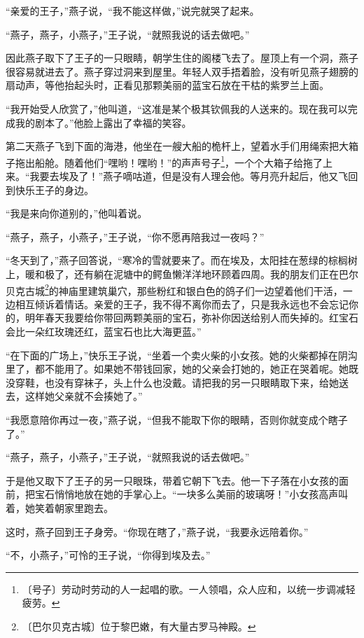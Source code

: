 \documentclass[12pt,UTF-8,openany]{ctexbook}
\begin{document}
\begin{normalsize}
    “亲爱的王子，”燕子说，“我不能这样做，”说完就哭了起来。
    
    “燕子，燕子，小燕子，”王子说，“就照我说的话去做吧。”
    
    因此燕子取下了王子的一只眼睛，朝学生住的阁楼飞去了。屋顶上有一个洞，燕子很容易就进去了。燕子穿过洞来到屋里。年轻人双手捂着脸，没有听见燕子翅膀的扇动声，等他抬起头时，正看见那颗美丽的蓝宝石放在干枯的紫罗兰上面。
    
    “我开始受人欣赏了，”他叫道，“这准是某个极其钦佩我的人送来的。现在我可以完成我的剧本了。”他脸上露出了幸福的笑容。
    
    第二天燕子飞到下面的海港，他坐在一艘大船的桅杆上，望着水手们用绳索把大箱子拖出船舱。随着他们“嘿哟！嘿哟！”的声声号子\footnote{〔号子〕劳动时劳动的人一起唱的歌。一人领唱，众人应和，以统一步调减轻疲劳。}，一个个大箱子给拖了上来。“我要去埃及了！”燕子嘀咕道，但是没有人理会他。等月亮升起后，他又飞回到快乐王子的身边。
    
    “我是来向你道别的，”他叫着说。
    
    “燕子，燕子，小燕子，”王子说，“你不愿再陪我过一夜吗？”
    
    “冬天到了，”燕子回答说，“寒冷的雪就要来了。而在埃及，太阳挂在葱绿的棕榈树上，暖和极了，还有躺在泥塘中的鳄鱼懒洋洋地环顾着四周。我的朋友们正在巴尔贝克古城\footnote{〔巴尔贝克古城〕位于黎巴嫩，有大量古罗马神殿。}的神庙里建筑巢穴，那些粉红和银白色的鸽子们一边望着他们干活，一边相互倾诉着情话。亲爱的王子，我不得不离你而去了，只是我永远也不会忘记你的，明年春天我要给你带回两颗美丽的宝石，弥补你因送给别人而失掉的。红宝石会比一朵红玫瑰还红，蓝宝石也比大海更蓝。”
    
    “在下面的广场上，”快乐王子说，“坐着一个卖火柴的小女孩。她的火柴都掉在阴沟里了，都不能用了。如果她不带钱回家，她的父亲会打她的，她正在哭着呢。她既没穿鞋，也没有穿袜子，头上什么也没戴。请把我的另一只眼睛取下来，给她送去，这样她父亲就不会揍她了。”
    
    “我愿意陪你再过一夜，”燕子说，“但我不能取下你的眼睛，否则你就变成个瞎子了。”
    
    “燕子，燕子，小燕子，”王子说，“就照我说的话去做吧。”
    
    于是他又取下了王子的另一只眼珠，带着它朝下飞去。他一下子落在小女孩的面前，把宝石悄悄地放在她的手掌心上。“一块多么美丽的玻璃呀！”小女孩高声叫着，她笑着朝家里跑去。
    
    这时，燕子回到王子身旁。“你现在瞎了，”燕子说，“我要永远陪着你。”
    
    “不，小燕子，”可怜的王子说，“你得到埃及去。”
    

\end{normalsize}
\end{document}
